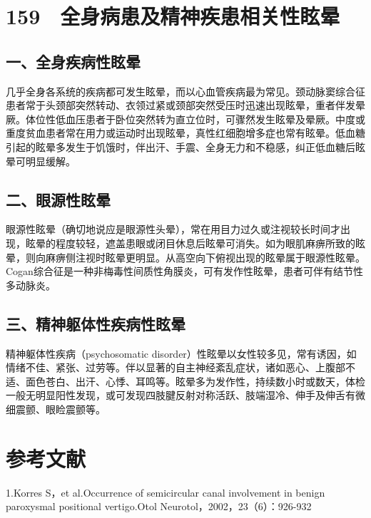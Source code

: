 \protect\hypertarget{text00362.html}{}{}

\section{159　全身病患及精神疾患相关性眩晕}

\subsection{一、全身疾病性眩晕}

几乎全身各系统的疾病都可发生眩晕，而以心血管疾病最为常见。颈动脉窦综合征患者常于头颈部突然转动、衣领过紧或颈部突然受压时迅速出现眩晕，重者伴发晕厥。体位性低血压患者于卧位突然转为直立位时，可骤然发生眩晕及晕厥。中度或重度贫血患者常在用力或运动时出现眩晕，真性红细胞增多症也常有眩晕。低血糖引起的眩晕多发生于饥饿时，伴出汗、手震、全身无力和不稳感，纠正低血糖后眩晕可明显缓解。

\subsection{二、眼源性眩晕}

眼源性眩晕（确切地说应是眼源性头晕），常在用目力过久或注视较长时间才出现，眩晕的程度较轻，遮盖患眼或闭目休息后眩晕可消失。如为眼肌麻痹所致的眩晕，则向麻痹侧注视时眩晕更明显。从高空向下俯视出现的眩晕属于眼源性眩晕。Cogan综合征是一种非梅毒性间质性角膜炎，可有发作性眩晕，患者可伴有结节性多动脉炎。

\subsection{三、精神躯体性疾病性眩晕}

精神躯体性疾病（psychosomatic
disorder）性眩晕以女性较多见，常有诱因，如情绪不佳、紧张、过劳等。伴以显著的自主神经紊乱症状，诸如恶心、上腹部不适、面色苍白、出汗、心悸、耳鸣等。眩晕多为发作性，持续数小时或数天，体检一般无明显阳性发现，或可发现四肢腱反射对称活跃、肢端湿冷、伸手及伸舌有微细震颤、眼睑震颤等。

\protect\hypertarget{text00363.html}{}{}

\section{参考文献}

1.Korres S，et al.Occurrence of semicircular canal involvement in benign
paroxysmal positional vertigo.Otol Neurotol，2002，23（6）：926-932

